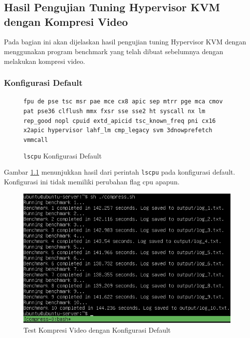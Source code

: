 \chapter{\babEmpat}

\section{Hasil Pengujian Tuning Hypervisor KVM dengan Kompresi Video}
Pada bagian ini akan dijelaskan hasil pengujian tuning Hypervisor KVM dengan menggunakan program benchmark yang telah dibuat sebelumnya dengan melakukan kompresi video.

\subsection{Konfigurasi Default}
\begin{figure}
    \texttt{fpu de pse tsc msr pae mce cx8 apic sep mtrr pge mca cmov pat pse36 clflush mmx fxsr sse sse2 ht syscall nx lm rep\_good nopl cpuid extd\_apicid tsc\_known\_freq pni cx16 x2apic hypervisor lahf\_lm cmp\_legacy svm 3dnowprefetch vmmcall}
    \caption{\texttt{lscpu} Konfigurasi Default}
    \label{fig:lscpu_video_compression_test_original}
\end{figure}

Gambar \ref{fig:lscpu_video_compression_test_original} menunjukkan hasil dari perintah \texttt{lscpu} pada konfigurasi default. Konfigurasi ini tidak memiliki perubahan flag cpu apapun.

\begin{figure}
    \centering
    \includegraphics[width=1\textwidth]
    {assets/pics/video-compression-test/original.jpeg}
    \caption{Test Kompresi Video dengan Konfigurasi Default}
    \label{fig:video_compression_test_original}
\end{figure}

